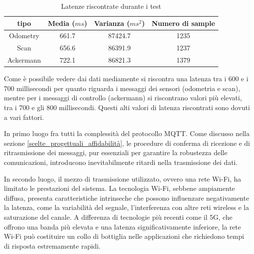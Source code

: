 \begin{center}
  \begin{table}[h]
  \centering
    \begin{tabular}{|c|c|c|c|}
    \hline
      tipo & Media ($ms$) & Varianza ($ms^2$) & Numero di sample\\ 
      \hline\hline
      Odometry & 661.7 & 87424.7 & 1235\\
      \hline
      Scan & 656.6 & 86391.9 & 1237\\
      \hline 
      Ackermann & 722.1 & 86821.3 & 1379\\ 
      \hline 
    \end{tabular}
    \caption{Latenze riscontrate durante i test}
    \label{tabella_latenza}
  \end{table}
\end{center}

\noindent Come è possibile vedere dai dati mediamente si riscontra una latenza tra i 600 e i 700 millisecondi per quanto riguarda i messaggi dei sensori (odometria e scan), mentre per i messaggi di controllo (ackermann) si riscontrano valori più elevati, tra i 700 e gli 800 millisecondi. Questi alti valori di latenza riscontrati sono dovuti a vari fattori. 

\noindent In primo luogo fra tutti la complessità del protocollo MQTT. Come discusso nella sezione \ref{scelte_progettuali_affidabilità}, le procedure di conferma di ricezione e di ritrasmissione dei messaggi, pur essenziali per garantire la robustezza delle comunicazioni, introducono inevitabilmente ritardi nella trasmissione dei dati.

\noindent In secondo luogo, il mezzo di trasmissione utilizzato, ovvero una rete Wi-Fi, ha limitato le prestazioni del sistema. La tecnologia Wi-Fi, sebbene ampiamente diffusa, presenta caratteristiche intrinseche che possono influenzare negativamente la latenza, come la variabilità del segnale, l'interferenza con altre reti wireless e la saturazione del canale. A differenza di tecnologie più recenti come il 5G, che offrono una banda più elevata e una latenza significativamente inferiore, la rete Wi-Fi può costituire un collo di bottiglia nelle applicazioni che richiedono tempi di risposta estremamente rapidi.


